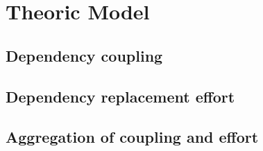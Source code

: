 \chapter{Theoric Model}\label{ch:TheoricModel}

\section{Dependency coupling}

\section{Dependency replacement effort}

\section{Aggregation of coupling and effort}
